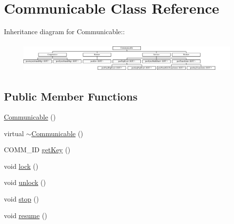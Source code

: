 \hypertarget{classCommunicable}{
\section{Communicable Class Reference}
\label{classCommunicable}
}
Inheritance diagram for Communicable::\begin{figure}[H]
\begin{center}
\leavevmode
\includegraphics[height=1.6cm]{classCommunicable}
\end{center}
\end{figure}
\subsection*{Public Member Functions}
\begin{CompactItemize}
\item 
\hypertarget{classCommunicable_8ae1827ecf7569b3db1ed386c7d8ad78}{
\hyperlink{classCommunicable_8ae1827ecf7569b3db1ed386c7d8ad78}{Communicable} ()}
\label{classCommunicable_8ae1827ecf7569b3db1ed386c7d8ad78}

\item 
\hypertarget{classCommunicable_2280b0dfa0d3a515fccf62c2a9fd5f41}{
virtual \hyperlink{classCommunicable_2280b0dfa0d3a515fccf62c2a9fd5f41}{$\sim$Communicable} ()}
\label{classCommunicable_2280b0dfa0d3a515fccf62c2a9fd5f41}

\item 
\hypertarget{classCommunicable_db4307b69b9ccacff55fdbf84b8f50e4}{
COMM\_\-ID \hyperlink{classCommunicable_db4307b69b9ccacff55fdbf84b8f50e4}{get\-Key} ()}
\label{classCommunicable_db4307b69b9ccacff55fdbf84b8f50e4}

\item 
\hypertarget{classCommunicable_e1f8bd1ee810fd73d44315c95998d19d}{
void \hyperlink{classCommunicable_e1f8bd1ee810fd73d44315c95998d19d}{lock} ()}
\label{classCommunicable_e1f8bd1ee810fd73d44315c95998d19d}

\item 
\hypertarget{classCommunicable_caa814847192e71f434fbf9479ede862}{
void \hyperlink{classCommunicable_caa814847192e71f434fbf9479ede862}{unlock} ()}
\label{classCommunicable_caa814847192e71f434fbf9479ede862}

\item 
\hypertarget{classCommunicable_cb53e6534b947bc889aa181d9dbbd13b}{
void \hyperlink{classCommunicable_cb53e6534b947bc889aa181d9dbbd13b}{stop} ()}
\label{classCommunicable_cb53e6534b947bc889aa181d9dbbd13b}

\item 
\hypertarget{classCommunicable_3306a9adb11a0ab5af342c0db9f7bb2a}{
void \hyperlink{classCommunicable_3306a9adb11a0ab5af342c0db9f7bb2a}{resume} ()}
\label{classCommunicable_3306a9adb11a0ab5af342c0db9f7bb2a}

\end{CompactItemize}
